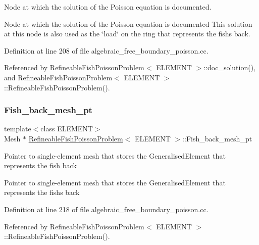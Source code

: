 Node at which the solution of the Poisson equation is documented. 

Node at which the solution of the Poisson equation is documented This solution at this node is also used as the \char`\"{}load\char`\"{} on the ring that represents the fish\textquotesingle{}s back. 

Definition at line 208 of file algebraic\+\_\+free\+\_\+boundary\+\_\+poisson.\+cc.



Referenced by Refineable\+Fish\+Poisson\+Problem$<$ E\+L\+E\+M\+E\+N\+T $>$\+::doc\+\_\+solution(), and Refineable\+Fish\+Poisson\+Problem$<$ E\+L\+E\+M\+E\+N\+T $>$\+::\+Refineable\+Fish\+Poisson\+Problem().

\mbox{\label{classRefineableFishPoissonProblem_ac0f6f58b393715961214d98e11dfad57}} 
\subsubsection{\texorpdfstring{Fish\+\_\+back\+\_\+mesh\+\_\+pt}{Fish\_back\_mesh\_pt}}
{\footnotesize\ttfamily template$<$class E\+L\+E\+M\+E\+NT$>$ \\
Mesh $\ast$ \hyperlink{classRefineableFishPoissonProblem}{Refineable\+Fish\+Poisson\+Problem}$<$ E\+L\+E\+M\+E\+NT $>$\+::Fish\+\_\+back\+\_\+mesh\+\_\+pt\hspace{0.3cm}{\ttfamily [private]}}

Pointer to single-\/element mesh that stores the Generalised\+Element that represents the fish back

Pointer to single-\/element mesh that stores the Generalised\+Element that represents the fish\textquotesingle{}s back 

Definition at line 218 of file algebraic\+\_\+free\+\_\+boundary\+\_\+poisson.\+cc.



Referenced by Refineable\+Fish\+Poisson\+Problem$<$ E\+L\+E\+M\+E\+N\+T $>$\+::\+Refineable\+Fish\+Poisson\+Problem().

\mbox{\label{classRefineableFishPoissonProblem_a769ab4e05f6962a7c8fc85f03a261916}} 
